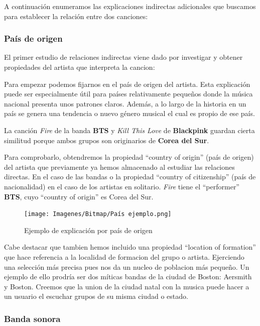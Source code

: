 A continuación enumeramos las explicaciones indirectas adicionales que buscamos para establecer la relación entre dos canciones:

\subsubsection*{País de origen}

El primer estudio de relaciones indirectas viene dado por investigar y obtener propiedades del artista que interpreta la cancion:

Para empezar podemos fijarnos en el país de origen del artista. Esta explicación puede ser especialmente útil para países relativamente pequeños donde la música nacional presenta unos patrones claros. Además, a lo largo de la historia en un país se genera una tendencia o nuevo género musical el cual es propio de ese país.

La canción \textit{Fire} de la banda \textbf{BTS} y \textit{Kill This Love} de \textbf{Blackpink} guardan cierta similitud porque ambos grupos son originarios de \textbf{Corea del Sur}.

Para comprobarlo, obtendremos la propiedad ``country of origin'' (país de origen) del artista que previamente ya hemos almacenado al estudiar las relaciones directas. En el caso de las bandas o la propiedad ``country of citizenship'' (país de nacionalidad) en el caso de los artistas en solitario. \textit{Fire} tiene el ``performer'' \textbf{BTS}, cuyo ``country of origin'' es Corea del Sur.

\begin{figure}[h!]
	\centering
	\texttt{[image: Imagenes/Bitmap/País ejemplo.png]}
	\caption{Ejemplo de explicación por país de origen}
	\label{fig:sampleImage}
\end{figure}

Cabe destacar que tambien hemos incluido una propiedad ``location of formation'' que hace referencia a la localidad de formacion del grupo o artista. Ejerciendo una selección más precisa pues nos da un nucleo de poblacion más pequeño. Un ejemplo de ello prodría ser dos míticas bandas de la ciudad de Boston: Aersmith y Boston. Creemos que la union de la ciudad natal con la musica puede hacer a un usuario el escuchar grupos de su misma ciudad o estado.

\subsubsection*{Banda sonora}



